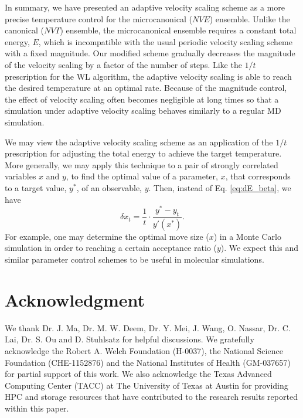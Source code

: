 \documentclass[reprint]{revtex4-1}
\begin{document}
In summary, we have presented an adaptive velocity scaling scheme
as a more precise temperature control for the microcanonical ($NVE$) ensemble.
%
Unlike the canonical ($NVT$) ensemble,
the microcanonical ensemble requires a constant total energy, $E$,
which is incompatible with the usual periodic velocity scaling scheme
with a fixed magnitude.
%
Our modified scheme gradually decreases the magnitude of the velocity scaling
by a factor of the number of steps.
%
Like the $1/t$ prescription\cite{
  belardinelli2007, *belardinelli2007jcp, *belardinelli2008,
  zhou2005, *zhou2008, *morozov2007}
for the WL algorithm\cite{wang2001, *wang2001pre},
the adaptive velocity scaling is able to reach
the desired temperature at an optimal rate.
%
Because of the magnitude control,
the effect of velocity scaling often becomes negligible
at long times so that
a simulation under adaptive velocity scaling
behaves similarly to a regular MD simulation.

We may view the adaptive velocity scaling scheme
as an application of the $1/t$ prescription
for adjusting the total energy
to achieve the target temperature.
%
More generally, we may apply this technique
to a pair of strongly correlated variables $x$ and $y$,
to find the optimal value of a parameter, $x$,
that corresponds to a target value, $y^*$, of an observable, $y$.
%
Then, instead of Eq. \eqref{eq:dE_beta},
we have
$$
\delta x_t = \frac 1 t
\cdot
\frac{ y^* - y_t }
     { y'(x^*) }
.
$$
%
For example, one may determine the optimal move size ($x$)
in a Monte Carlo simulation
in order to reaching a certain acceptance ratio ($y$).
%
We expect this and similar parameter control schemes
to be useful in molecular simulations.




\section{Acknowledgment}

We thank Dr. J. Ma, Dr. M. W. Deem, Dr. Y. Mei, J. Wang,
O. Nassar, Dr. C. Lai, Dr. S. Ou and D. Stuhlsatz
for helpful discussions.
We gratefully acknowledge the Robert A. Welch Foundation (H-0037),
the National Science Foundation (CHE-1152876)
and
the National Institutes of Health (GM-037657) for partial support of this work.
%
We also acknowledge the Texas Advanced Computing Center (TACC) at The University of Texas
at Austin for providing HPC and storage resources that have contributed to
the research results reported within this paper.
\end{document}
